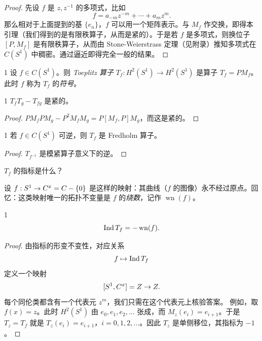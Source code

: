 \begin{proof}
先设 $f$ 是 $z,z^{-1}$ 的多项式，比如
\[ f=a_{-m}z^{-m}+\cdots+a_mz^m. \]
那么相对于上面提到的基 $\{e_n\}$，$f$ 可以用一个矩阵表示。与 $M_f$ 作交换，即得本引理（我们得到的是有限秩算子，从而是紧的）。于是若 $f$ 是多项式，则换位子 $[P,M_f]$ 是有限秩算子，从而由 Stone-Weierstrass 定理（见附录）推知多项式在 $C(S^1)$ 中稠密。通过逼近即得完全一般的结果。
\end{proof}


\begin{defn}{1}
设 $f\in C(S^1)$。则 \emph{Toeplitz 算子} $T_f: H^2(S^1)\to H^2(S^1)$ 是算子 $T_f=PM_f$。此时 $f$ 称为 $T_f$ 的\emph{符号}。
\end{defn}

\begin{prop}{1}
$T_fT_g-T_{fg}$ 是紧的。
\end{prop}


\begin{proof}
$PM_fPM_g-P^2M_fM_g=P[M_f,P]M_g$，而这是紧的。
\end{proof}

\begin{cor}{1}
若 $f\in C(S^1)$ 可逆，则 $T_f$ 是 Fredholm 算子。
\end{cor}

\begin{proof}
$T_{f^{-1}}$ 是模紧算子意义下的逆。
\end{proof}

 $T_f$ 的指标是什么？

设 $f: S^1\to C^x=C-\{0\}$ 是这样的映射：其曲线（$f$ 的图像）永不经过原点。回忆：这类映射唯一的拓扑不变量是 $f$ 的\emph{绕数}，记作 $\operatorname{wn}(f)$。

\begin{thm}{1}
\[ \operatorname{Ind} T_f=-\operatorname{wn}(f). \]
\end{thm}

\begin{proof}
由指标的形变不变性，对应关系
\[ f\mapsto \operatorname{Ind} T_f \]
定义一个映射
\[ [S^1,C^x]=Z\to Z. \]
每个同伦类都含有一个代表元 $z^m$，我们只需在这个代表元上核验答案。
例如，取 $f(x)=z$。此时 $H^2(S^1)$ 由 $e_0,e_1,e_2,\ldots$ 张成，而 $M_z(e_i)=e_{i+1}$。于是 $T_z=T_f$ 就是 $T_z(e_i)=e_{i+1}$，$i=0,1,2,\ldots$。因此 $T_z$ 是单侧移位，其指标为 $-1$。
\end{proof}

